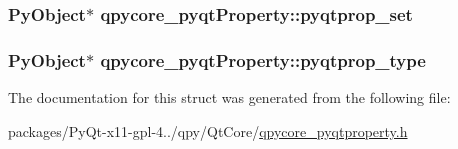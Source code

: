 \subsubsection[{pyqtprop\+\_\+set}]{\setlength{\rightskip}{0pt plus 5cm}Py\+Object$\ast$ qpycore\+\_\+pyqt\+Property\+::pyqtprop\+\_\+set}\label{structqpycore__pyqtProperty_ad47100e9486f2f7617d9d8d14bd7aad0}
\hypertarget{structqpycore__pyqtProperty_aeb21cfc9f9f22d989935a4c7e97feb60}{}
\subsubsection[{pyqtprop\+\_\+type}]{\setlength{\rightskip}{0pt plus 5cm}Py\+Object$\ast$ qpycore\+\_\+pyqt\+Property\+::pyqtprop\+\_\+type}\label{structqpycore__pyqtProperty_aeb21cfc9f9f22d989935a4c7e97feb60}


The documentation for this struct was generated from the following file\+:\begin{DoxyCompactItemize}
\item 
packages/\+Py\+Qt-\/x11-\/gpl-\/4../qpy/\+Qt\+Core/\hyperlink{qpycore__pyqtproperty_8h}{qpycore\+\_\+pyqtproperty.\+h}\end{DoxyCompactItemize}
